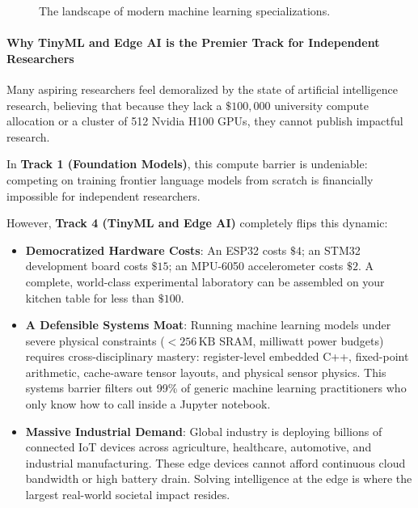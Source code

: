 \begin{figure}[htbp]
\caption{The landscape of modern machine learning specializations.}\label{fig:specialization_tracks}
\end{figure}

\paragraph{Why TinyML and Edge AI is the Premier Track for Independent Researchers}
Many aspiring researchers feel demoralized by the state of artificial intelligence research, believing that because they lack a $\$100{,}000$ university compute allocation or a cluster of 512 Nvidia H100 GPUs, they cannot publish impactful research.

In \textbf{Track 1 (Foundation Models)}, this compute barrier is undeniable: competing on training frontier language models from scratch is financially impossible for independent researchers.

However, \textbf{Track 4 (TinyML and Edge AI)} completely flips this dynamic:
\begin{itemize}
    \item \textbf{Democratized Hardware Costs}: An ESP32 costs $\$4$; an STM32 development board costs $\$15$; an MPU-6050 accelerometer costs $\$2$. A complete, world-class experimental laboratory can be assembled on your kitchen table for less than $\$100$.
    \item \textbf{A Defensible Systems Moat}: Running machine learning models under severe physical constraints ($< 256\,\text{KB}$ SRAM, milliwatt power budgets) requires cross-disciplinary mastery: register-level embedded C++, fixed-point arithmetic, cache-aware tensor layouts, and physical sensor physics. This systems barrier filters out 99\% of generic machine learning practitioners who only know how to call  inside a Jupyter notebook.
    \item \textbf{Massive Industrial Demand}: Global industry is deploying billions of connected IoT devices across agriculture, healthcare, automotive, and industrial manufacturing. These edge devices cannot afford continuous cloud bandwidth or high battery drain. Solving intelligence at the edge is where the largest real-world societal impact resides.
\end{itemize}

